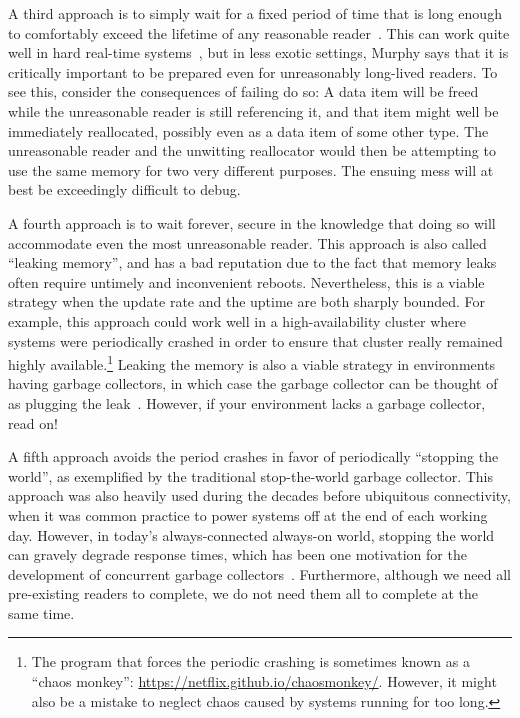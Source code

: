 A third approach is to simply wait for a fixed period of time that is
long enough to comfortably exceed the lifetime of any reasonable
reader~\cite{Jacobson93,AjuJohn95}.
This can work quite well in hard real-time systems~\cite{YuxinRen2018RTRCU},
but in less exotic
settings, Murphy says that it is critically important to be prepared
even for unreasonably long-lived readers.
To see this, consider the consequences of failing do so:
A data item will be freed while the unreasonable reader is still
referencing it, and that item might well be immediately reallocated,
possibly even as a data item of some other type.
The unreasonable reader and the unwitting reallocator would then
be attempting to use the same memory for two very different purposes.
The ensuing mess will at best be exceedingly difficult to debug.

A fourth approach is to wait forever, secure in the knowledge that
doing so will accommodate even the most unreasonable reader.
This approach is also called ``leaking memory'', and has a bad reputation
due to the fact that memory leaks often require untimely and
inconvenient reboots.
Nevertheless, this is a viable strategy when the update rate and the
uptime are both sharply bounded.
For example, this approach could work well in a high-availability
cluster where systems were periodically crashed in order to ensure
that cluster really remained highly available.\footnote{
	The program that forces the periodic crashing is sometimes
	known as a ``chaos monkey'':
	\url{https://netflix.github.io/chaosmonkey/}.
	However, it might also be a mistake to neglect chaos caused
	by systems running for too long.}
Leaking the memory is also a viable strategy in environments having
garbage collectors, in which case the garbage collector can be thought
of as plugging the leak~\cite{Kung80}.
However, if your environment lacks a garbage collector, read on!

A fifth approach avoids the period crashes in favor of periodically
``stopping the world'', as exemplified by the traditional stop-the-world
garbage collector.
This approach was also heavily used during the decades before
ubiquitous connectivity, when it was common practice to power systems
off at the end of each working day.
However, in today's always-connected always-on world, stopping the world
can gravely degrade response times, which has been one motivation for the
development of concurrent garbage collectors~\cite{DavidFBacon2003RTGC}.
Furthermore, although we need all pre-existing readers to complete, we do
not need them all to complete at the same time.

